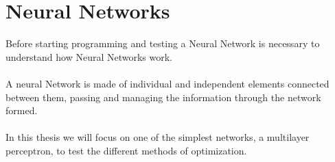 \documentclass[a4paper, 11pt]{article}
\begin{document}
\newpage \pagestyle{extended_plain}
\section{Neural Networks} 
Before starting programming and testing a Neural Network is necessary to understand how Neural Networks work.\\
\textcolor{white}{a}\\
A neural Network is made of individual and independent elements connected between them, passing and managing the information through the network formed.\\
\textcolor{white}{a}\\
In this thesis we will focus on one of the simplest networks, a multilayer perceptron, to test the different methods of optimization.
\end{document}
